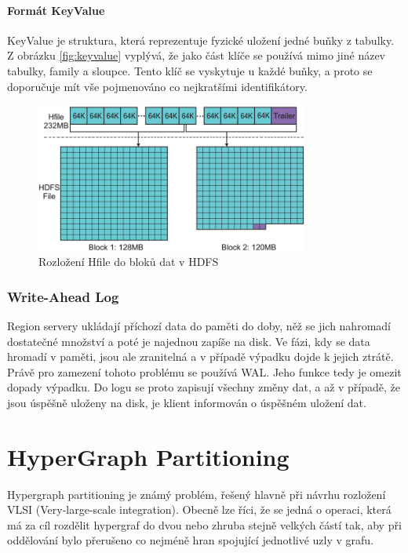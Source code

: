 \documentclass[thesis=M,czech]{FITthesis}[2012/06/26]
\begin{document}
\paragraph{Formát KeyValue}
KeyValue je struktura, která reprezentuje fyzické uložení jedné buňky z tabulky. Z obrázku \ref{fig:keyvalue} vyplývá, že jako část klíče se používá mimo jiné  název tabulky, family a sloupce. Tento klíč se vyskytuje u každé buňky, a proto se doporučuje mít vše pojmenováno co nejkratšími identifikátory.	
\begin{figure}[h]\centering
	\includegraphics[width=0.8\textwidth, angle=0]{files/HFileToHDFS}
	\caption[Rozložení Hfile do bloků dat v HDFS]{Rozložení Hfile do bloků dat v HDFS}\label{fig:hfiletohdfs}
\end{figure}


\subsubsection{Write-Ahead Log}
Region servery ukládají příchozí data do paměti do doby, něž se jich nahromadí dostatečné množství a poté je najednou zapíše na disk. Ve fázi, kdy se data hromadí v paměti, jsou ale zranitelná a v případě výpadku dojde k jejich ztrátě. Právě pro zamezení tohoto problému se používá WAL. Jeho funkce tedy je omezit dopady výpadku. Do logu se proto zapisují všechny změny dat, a až v případě, že jsou úspěšně uloženy na disk, je klient informován o úspěšném uložení dat. 

\section{HyperGraph Partitioning}
Hypergraph partitioning je známý problém, řešený hlavně při návrhu rozložení VLSI (Very-large-scale integration). Obecně lze říci, že se jedná o operaci, která má za cíl rozdělit hypergraf do dvou nebo zhruba stejně velkých částí tak, aby při oddělování bylo přerušeno co nejméně hran spojující jednotlivé uzly v grafu.
\end{document}
